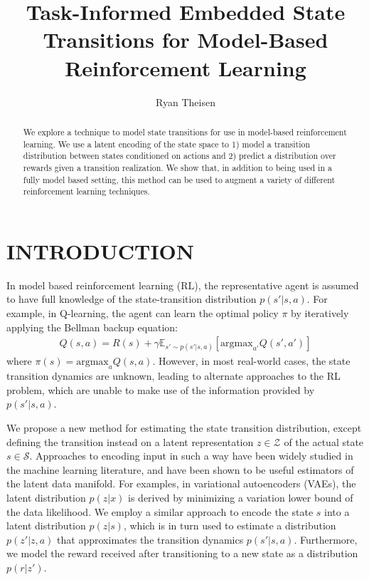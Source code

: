 \documentclass[letterpaper, 10 pt, conference]{ieeeconf}  %
\title{\LARGE \bf
Task-Informed Embedded State Transitions for Model-Based Reinforcement Learning
}
\author{Ryan Theisen}%
\begin{document}
\maketitle
\thispagestyle{empty}
\pagestyle{empty}


\begin{abstract}

We explore a technique to model state transitions for use in model-based reinforcement learning. We use a latent encoding of the state space to 1) model a transition distribution between states conditioned on actions and 2) predict a distribution over rewards given a transition realization. We show that, in addition to being used in a fully model based setting, this method can be used to augment a variety of different reinforcement learning techniques.

\end{abstract}


\section{INTRODUCTION}

In model based reinforcement learning (RL), the representative agent is assumed to have full knowledge of the state-transition distribution $p(s'|s,a)$. For example, in Q-learning, the agent can learn the optimal policy $\pi$ by iteratively applying the Bellman backup equation:
\begin{align*}
	Q(s,a) = R(s) + \gamma\mathbb{E}_{s'\sim p(s'|s,a)}[\text{argmax}_{a'}Q(s',a')]
\end{align*}
where $\pi(s) = \text{argmax}_{a}Q(s,a)$. However, in most real-world cases, the state transition dynamics are unknown, leading to alternate approaches to the RL problem, which are unable to make use of the information provided by $p(s'|s,a)$.

We propose a new method for estimating the state transition distribution, except defining the transition instead on a latent representation $z\in\mathcal{Z}$ of the actual state $s\in\mathcal{S}$. Approaches to encoding input in such a way have been widely studied in the machine learning literature, and have been shown to be useful estimators of the latent data manifold. For examples, in variational autoencoders (VAEs), the latent distribution $p(z|x)$ is derived by minimizing a variation lower bound of the data likelihood. We employ a similar approach to encode the state $s$ into a latent distribution $p(z|s)$, which is in turn used to estimate a distribution $p(z'|z,a)$ that approximates the transition dynamics $p(s'|s,a)$. Furthermore, we model the reward received after transitioning to a new state as a distribution $p(r|z')$.
\end{document}
